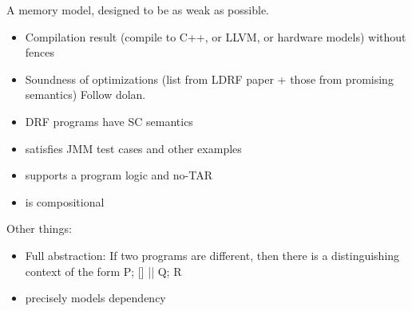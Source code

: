 A memory model, designed to be as weak as possible.
\begin{itemize}
\item Compilation result (compile to C++, or LLVM, or hardware models) without fences
\item Soundness of optimizations (list from LDRF paper + those from promising
  semantics)  Follow dolan.
\item DRF programs have SC semantics
\item satisfies JMM test cases and other examples
\item supports a program logic and no-TAR
\item is compositional
\end{itemize}  

Other things:
\begin{itemize}
\item Full abstraction:  If two programs are different, then there is a
  distinguishing context of the form P; [] || Q; R
\item precisely models dependency
\end{itemize}

